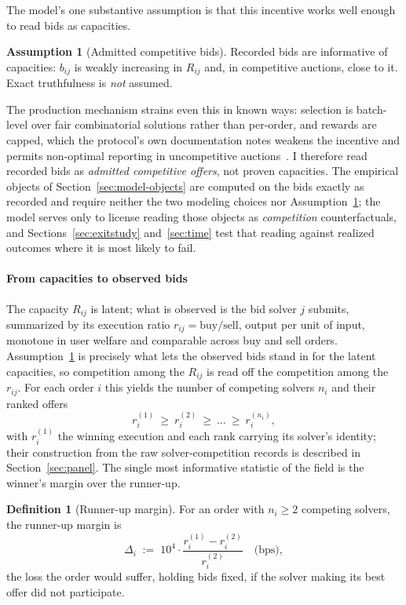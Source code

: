 \documentclass[11pt]{article}
\theoremstyle{plain}
\theoremstyle{definition}
\newtheorem{definition}{Definition}
\newtheorem{assumption}{Assumption}
\theoremstyle{remark}
\begin{document}
The model's one substantive assumption is that this incentive works well enough to read bids as capacities.
\begin{assumption}[Admitted competitive bids]\label{ass:truth}
Recorded bids are informative of capacities: $b_{ij}$ is weakly increasing in $R_{ij}$ and, in competitive auctions, close to it. Exact truthfulness is \emph{not} assumed.
\end{assumption}
The production mechanism strains even this in known ways: selection is batch-level over fair combinatorial solutions rather than per-order, and rewards are capped, which the protocol's own documentation notes weakens the incentive and permits non-optimal reporting in uncompetitive auctions~\citep{cowdao_rewards,cowdao_rules}. I therefore read recorded bids as \emph{admitted competitive offers}, not proven capacities. The empirical objects of Section~\ref{sec:model-objects} are computed on the bids exactly as recorded and require neither the two modeling choices nor Assumption~\ref{ass:truth}; the model serves only to license reading those objects as \emph{competition} counterfactuals, and Sections~\ref{sec:exitstudy} and~\ref{sec:time} test that reading against realized outcomes where it is most likely to fail.

\paragraph{From capacities to observed bids} The capacity $R_{ij}$ is latent; what is observed is the bid solver $j$ submits, summarized by its execution ratio $r_{ij}=\text{buy}/\text{sell}$, output per unit of input, monotone in user welfare and comparable across buy and sell orders. Assumption~\ref{ass:truth} is precisely what lets the observed bids stand in for the latent capacities, so competition among the $R_{ij}$ is read off the competition among the $r_{ij}$. For each order $i$ this yields the number of competing solvers $n_i$ and their ranked offers
\begin{equation}\label{eq:ranked}
r_i^{(1)}\ \ge\ r_i^{(2)}\ \ge\ \dots\ \ge\ r_i^{(n_i)},
\end{equation}
with $r_i^{(1)}$ the winning execution and each rank carrying its solver's identity; their construction from the raw solver-competition records is described in Section~\ref{sec:panel}. The single most informative statistic of the field is the winner's margin over the runner-up.

\begin{definition}[Runner-up margin]\label{def:gap}
For an order with $n_i \ge 2$ competing solvers, the runner-up margin is
\begin{equation}\label{eq:gap}
\Delta_i \;:=\; 10^4 \cdot \frac{r_i^{(1)} - r_i^{(2)}}{r_i^{(2)}} \quad \text{(bps)},
\end{equation}
the loss the order would suffer, holding bids fixed, if the solver making its best offer did not participate.
\end{definition}
\end{document}

